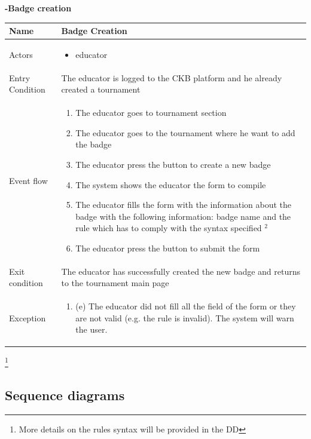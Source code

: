 \begin{enumerate}[label=\textbf{[UC\arabic*]}]
 \item \textbf{-Badge creation}
    \\ \begin{tabular}{|l|p{11cm}|}
        \hline
        Name & Badge Creation \\
        \hline
        Actors & \begin{itemize}
                    \item educator
                \end{itemize} \\
        \hline
        Entry Condition & The educator is logged to the CKB platform and he already created a tournament\\
        \hline
        Event flow & \begin{enumerate}
            \item The educator goes to tournament section
            \item The educator goes to the tournament where he want to add the badge
            \item The educator press the button to create a new badge
            \item The system shows the educator the form to compile
            \item The educator fills the form with the information about the badge with the following information: badge name and the rule which has to comply with the syntax specified $^2$
            \item The educator press the button to submit the form
        \end{enumerate}\\
        \hline
        Exit condition & The educator has successfully created the new badge and returns to the tournament main page \\
        \hline
        Exception & \begin{enumerate} [label={}, leftmargin=0.25cm ]
            \item (e) The educator did not fill all the field of the form or they are not valid  (e.g. the rule is invalid). The system will warn the user. 
        \end{enumerate}\\
        \hline            
    \end{tabular}
\footnote{More details on the rules syntax will be provided in the DD}

\newpage

\subsection{Sequence diagrams}


\end{enumerate}

